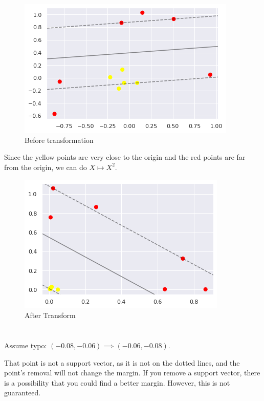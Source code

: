 \documentclass[12pt]{article}
\begin{document}
\section{}
\begin{figure}[H]
	\centering
	\includegraphics{images/5before.png}
	\caption{Before transformation}
	\label{fig:5:before}
\end{figure}
Since the yellow points are very close to the origin and the red points are far from the origin, we can do $ X \mapsto X^2 $.
\begin{figure}[H]
	\centering
	\includegraphics{images/5after.png}
	\caption{After Transform}
	\label{fig:5:after}
\end{figure}
\newpage

\section{}
Assume typo: $ (-0.08, -0.06) \implies (-0.06, -0.08) $. 
\par That point is not a support vector, as it is not on the dotted lines, and the point's removal will not change the margin. If you remove a support vector, there is a possibility that you could find a better margin. However, this is not guaranteed.
\newpage 
\end{document}
